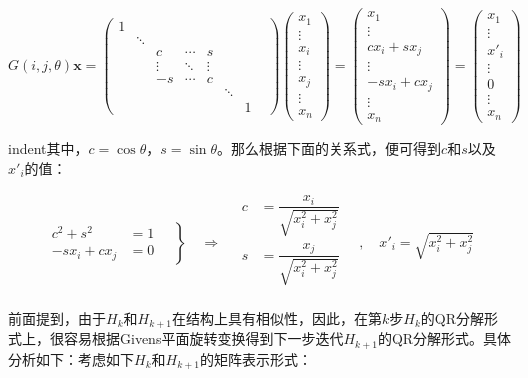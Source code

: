 \documentclass[UTF8,nofonts]{ctexart}
\begin{document}
\[
G(i,j,\theta)\boldsymbol{x}=
\begin{pmatrix}
	1&&&&&&\\&\ddots&&&&&\\
	&&c&\cdots&s&&\\
	&&\vdots&\ddots&\vdots&&&\\
	&&-s&\cdots&c&&\\
	&&&&&\ddots&\\&&&&&&1
\end{pmatrix}
\begin{pmatrix}
	x_1\\\vdots\\x_i\\\vdots\\x_j\\\vdots\\x_n
\end{pmatrix}=
\begin{pmatrix}
	x_1\\\vdots\\cx_i+sx_j\\\vdots\\-sx_i+cx_j\\\vdots\\x_n
\end{pmatrix}=
\begin{pmatrix}
	x_1\\\vdots\\x'_i\\\vdots\\0\\\vdots\\x_n
\end{pmatrix}
\]

indent其中，$c=\cos\theta$，$s=\sin\theta$。那么根据下面的关系式，便可得到$c$和$s$以及$x'_i$的值：

\begin{equation*}
\left.
	\begin{aligned} c^2+s^2&=1 \\ -sx_i+cx_j&=0 \end{aligned} \quad
\right\}\quad\Longrightarrow\quad
\begin{aligned}
	c&=\dfrac{x_i}{\sqrt{x_i^2+x_j^2}} \\
	s&=\dfrac{x_j}{\sqrt{x_i^2+x_j^2}} \\
\end{aligned}\quad,\quad
x'_i=\sqrt{x_i^2+x_j^2}
\end{equation*}

前面提到，由于$H_{k}$和$H_{k+1}$在结构上具有相似性，因此，在第$k$步$H_k$的QR分解形式上，很容易根据Givens平面旋转变换得到下一步迭代$H_{k+1}$的QR分解形式。具体分析如下：考虑如下$H_k$和$H_{k+1}$的矩阵表示形式：
\end{document}
